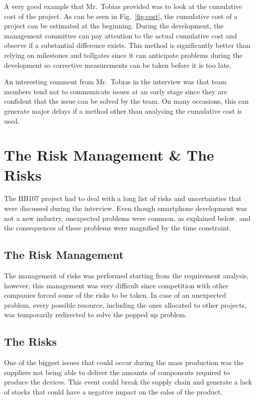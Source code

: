 \documentclass[conference]{IEEEtran}
\begin{document}
A very good example that Mr.~Tobias provided was to look at the cumulative cost of the project. As can be seen in Fig.~\ref{fig:cost}, the cumulative cost of a project can be estimated at the beginning. During the development, the management committee can pay attention to the actual cumulative cost and observe if a substantial difference exists. This method is significantly better than relying on milestones and tollgates since it can anticipate problems during the development so corrective measurements can be taken before it is too late.

An interesting comment from Mr.~Tobias in the interview was that team members tend not to communicate issues at an early stage since they are confident that the issue can be solved by the team. On many occasions, this can generate major delays if a method other than analysing the cumulative cost is used.

\section{The Risk Management \& The Risks}
The HB107 project had to deal with a long list of risks and uncertainties that were discussed during the interview. Even though smartphone development was not a new industry, unexpected problems were common, as explained below, and the consequences of these problems were magnified by the time constraint. 

\subsection{The Risk Management}
The management of risks was performed starting from the requirement analysis, however, this management was very difficult since competition with other companies forced some of the risks to be taken. In case of an unexpected problem, every possible resource, including the ones allocated to other projects, was temporarily redirected to solve the popped up problem.

\subsection{The Risks}
One of the biggest issues that could occur during the mass production was the suppliers not being able to deliver the amounts of components required to produce the devices. This event could break the supply chain and generate a lack of stocks that could have a negative impact on the sales of the product.
\end{document}
